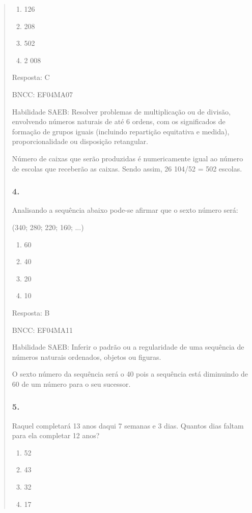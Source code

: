\begin{enumerate}
\begin{escolha}
\begin{enumerate}
\begin{itemize}
\begin{itemize}
\begin{escolha}
\begin{quote}
\begin{escolha}
{\begin{enumerate}
\def\labelenumi{\alph{enumi})}
\item
  126
\item
  208
\item
  502
\item
  2 008
\end{enumerate}

Resposta: C

BNCC: EF04MA07

Habilidade SAEB: Resolver problemas de multiplicação ou de divisão,
envolvendo números naturais de até 6 ordens, com os significados de
formação de grupos iguais (incluindo repartição equitativa e medida),
proporcionalidade ou disposição retangular.

Número de caixas que serão produzidas é numericamente igual ao número de
escolas que receberão as caixas. Sendo assim, 26 104/52 = 502 escolas.

\subsubsection{4. }\label{section-160}

Analisando a sequência abaixo pode-se afirmar que o sexto número será:

(340; 280; 220; 160; ...)

\begin{enumerate}
\def\labelenumi{\alph{enumi})}
\item
  60
\item
  40
\item
  20
\item
  10
\end{enumerate}

Resposta: B

BNCC: EF04MA11

Habilidade SAEB: Inferir o padrão ou a regularidade de uma sequência de
números naturais ordenados, objetos ou figuras.

O sexto número da sequência será o 40 pois a sequência está diminuindo
de 60 de um número para o seu sucessor.

\subsubsection{5.}\label{section-161}

Raquel completará 13 anos daqui 7 semanas e 3 dias. Quantos dias faltam
para ela completar 12 anos?

\begin{enumerate}
\def\labelenumi{\alph{enumi})}
\item
  52
\item
  43
\item
  32
\item
  17
\end{enumerate}

}
\end{escolha}
\end{quote}
\end{escolha}
\end{itemize}
\end{itemize}
\end{enumerate}
\end{escolha}
\end{enumerate}
